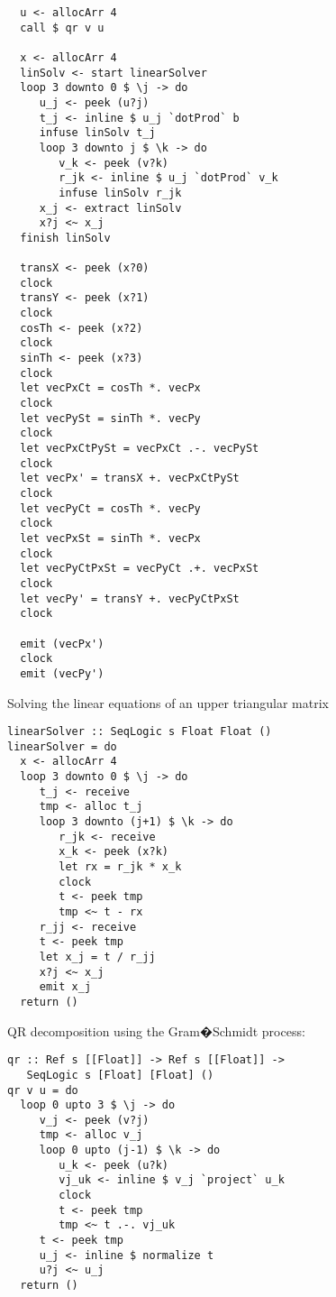 \documentclass[preprint]{sigplanconf}
\begin{document}
\begin{lstlisting}
  u <- allocArr 4
  call $ qr v u

  x <- allocArr 4
  linSolv <- start linearSolver
  loop 3 downto 0 $ \j -> do
     u_j <- peek (u?j)
     t_j <- inline $ u_j `dotProd` b
     infuse linSolv t_j
     loop 3 downto j $ \k -> do
        v_k <- peek (v?k)
        r_jk <- inline $ u_j `dotProd` v_k
        infuse linSolv r_jk
     x_j <- extract linSolv
     x?j <~ x_j
  finish linSolv
  
  transX <- peek (x?0)
  clock
  transY <- peek (x?1)
  clock
  cosTh <- peek (x?2)
  clock
  sinTh <- peek (x?3)
  clock
  let vecPxCt = cosTh *. vecPx
  clock
  let vecPySt = sinTh *. vecPy
  clock
  let vecPxCtPySt = vecPxCt .-. vecPySt
  clock
  let vecPx' = transX +. vecPxCtPySt
  clock
  let vecPyCt = cosTh *. vecPy
  clock
  let vecPxSt = sinTh *. vecPx
  clock
  let vecPyCtPxSt = vecPyCt .+. vecPxSt
  clock
  let vecPy' = transY +. vecPyCtPxSt
  clock

  emit (vecPx')
  clock
  emit (vecPy')
\end{lstlisting}

Solving the linear equations of an upper triangular matrix
\begin{lstlisting}
linearSolver :: SeqLogic s Float Float ()
linearSolver = do
  x <- allocArr 4
  loop 3 downto 0 $ \j -> do
     t_j <- receive
     tmp <- alloc t_j
     loop 3 downto (j+1) $ \k -> do
        r_jk <- receive
        x_k <- peek (x?k)
        let rx = r_jk * x_k
        clock
        t <- peek tmp
        tmp <~ t - rx
     r_jj <- receive
     t <- peek tmp
     let x_j = t / r_jj
     x?j <~ x_j
     emit x_j
  return ()
\end{lstlisting}

QR decomposition using the Gram�Schmidt process:
\begin{lstlisting}
qr :: Ref s [[Float]] -> Ref s [[Float]] ->
   SeqLogic s [Float] [Float] ()
qr v u = do
  loop 0 upto 3 $ \j -> do
     v_j <- peek (v?j)
     tmp <- alloc v_j
     loop 0 upto (j-1) $ \k -> do
        u_k <- peek (u?k)
        vj_uk <- inline $ v_j `project` u_k
        clock
        t <- peek tmp
        tmp <~ t .-. vj_uk
     t <- peek tmp
     u_j <- inline $ normalize t
     u?j <~ u_j
  return ()
\end{lstlisting}
\end{document}
